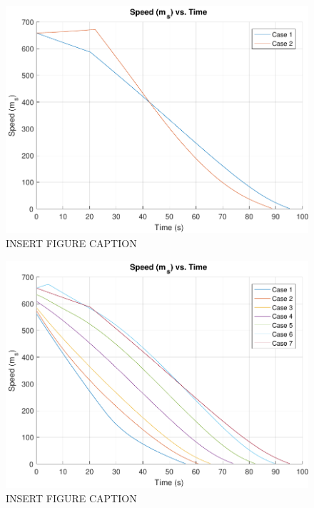 \begin{figure}[H]
	\centering
	\begin{minipage}{4.5 in}
		\includegraphics[width=\linewidth]{Figures/spdatmovsvac.pdf}
		\caption{INSERT FIGURE CAPTION \label{fig:spdatmovsvac} }
	\end{minipage}
\end{figure}



\begin{figure}[H]
	\centering
	\begin{minipage}{4.5 in}
		\includegraphics[width=\linewidth]{Figures/spdpowatmo.pdf}
		\caption{INSERT FIGURE CAPTION \label{fig:spdpowatmo} }
	\end{minipage}
\end{figure}



